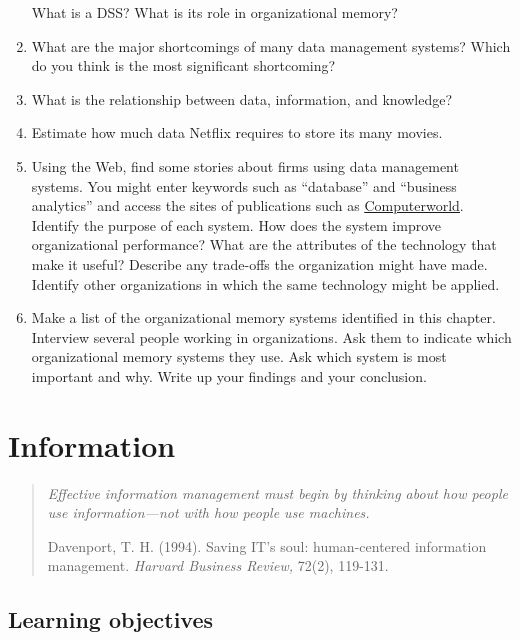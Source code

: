 \documentclass[
]{article}
\begin{document}
\begin{enumerate}
  What is a DSS? What is its role in organizational memory?
\item
  What are the major shortcomings of many data management systems?
  Which do you think is the most significant shortcoming?
\item
  What is the relationship between data, information, and knowledge?
\item
  Estimate how much data Netflix requires to store its many movies.
\item
  Using the Web, find some stories about firms using data management
  systems. You might enter keywords such as ``database'' and ``business
  analytics'' and access the sites of publications such as
  \href{http://www.computerworld.com/}{\underline{Computerworld}}. Identify the
  purpose of each system. How does the system improve organizational
  performance? What are the attributes of the technology that make it
  useful? Describe any trade-offs the organization might have made.
  Identify other organizations in which the same technology might be
  applied.
\item
  Make a list of the organizational memory systems identified in this
  chapter. Interview several people working in organizations. Ask them
  to indicate which organizational memory systems they use. Ask which
  system is most important and why. Write up your findings and your
  conclusion.
\end{enumerate}

\newpage

\hypertarget{information}{%
\section{Information}\label{information}}

\begin{quote}
\emph{Effective information management must begin by thinking about how
people use information---not with how people use machines.}

Davenport, T. H. (1994). Saving IT's soul: human-centered information
management. \emph{Harvard Business Review,} 72(2), 119-131.
\end{quote}

\hypertarget{learning-objectives-1}{%
\subsection*{Learning objectives}\label{learning-objectives-1}}
\end{document}

